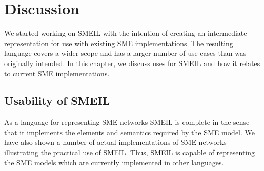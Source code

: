\chapter{Discussion}


We started working on SMEIL with the intention of creating an intermediate
representation for use with existing SME implementations. The resulting language
covers a wider scope and has a larger number of use cases than was originally
intended. In this chapter, we discuss uses for SMEIL and how it relates to
current SME implementations.






\section{Usability of SMEIL}
As a language for representing SME networks SMEIL is complete in the sense that
it implements the elements and semantics required by the SME model. We have also
shown a number of actual implementations of SME networks illustrating the
practical use of SMEIL. Thus, SMEIL is capable of representing the SME models
which are currently implemented in other languages.

